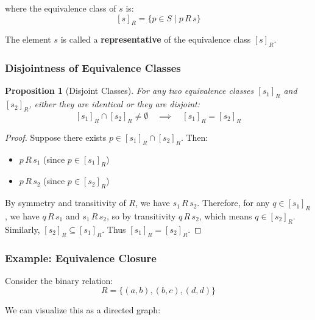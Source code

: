 \documentclass[11pt,a4paper]{article}
\theoremstyle{definition}
\theoremstyle{plain}
\newtheorem{proposition}[theorem]{Proposition}
\theoremstyle{remark}
\begin{document}
where the equivalence class of $s$ is:
\[
[s]_R = \{p \in S \mid p \, R \, s\}
\]

The element $s$ is called a \textbf{representative} of the equivalence class $[s]_R$.

\subsubsection{Disjointness of Equivalence Classes}

\begin{proposition}[Disjoint Classes]
For any two equivalence classes $[s_1]_R$ and $[s_2]_R$, either they are identical or they are disjoint:
\[
[s_1]_R \cap [s_2]_R \neq \emptyset \quad \implies \quad [s_1]_R = [s_2]_R
\]
\end{proposition}

\begin{proof}
Suppose there exists $p \in [s_1]_R \cap [s_2]_R$. Then:
\begin{itemize}
    \item $p \, R \, s_1$ (since $p \in [s_1]_R$)
    \item $p \, R \, s_2$ (since $p \in [s_2]_R$)
\end{itemize}

By symmetry and transitivity of $R$, we have $s_1 \, R \, s_2$. Therefore, for any $q \in [s_1]_R$, we have $q \, R \, s_1$ and $s_1 \, R \, s_2$, so by transitivity $q \, R \, s_2$, which means $q \in [s_2]_R$. Similarly, $[s_2]_R \subseteq [s_1]_R$. Thus $[s_1]_R = [s_2]_R$.
\end{proof}

\subsubsection{Example: Equivalence Closure}

Consider the binary relation:
\[
R = \{(a, b), (b, c), (d, d)\}
\]

We can visualize this as a directed graph:
\begin{center}
\end{center}
\end{document}
